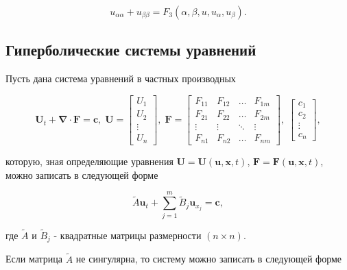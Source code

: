 			\begin{equation}
				u_{\alpha \alpha} + u_{\beta \beta} = F_{3} \left( \alpha, \beta, u, u_{\alpha}, u_{\beta} \right).
			\end{equation}

		\newpage

	\subsection*{Гиперболические системы уравнений}

		Пусть дана система уравнений в частных производных

		\begin{equation}
			\mathbf{U}_{t} + \mathbf{\nabla} \cdot \mathbf{F} = \mathbf{c}, \;
			\mathbf{U} =
			\begin{bmatrix}
				U_{1} \\
				U_{2} \\
				\vdots \\
				U_{n}
			\end{bmatrix}, \;
			\mathbf{F} =
			\begin{bmatrix}
				F_{11} & F_{12} & \ldots & F_{1m} \\
				F_{21} & F_{22} & \ldots & F_{2m} \\
				\vdots & \vdots & \ddots & \vdots \\
				F_{n1} & F_{n2} & \ldots & F_{nm}
			\end{bmatrix}, \;
			\begin{bmatrix}
				c_{1} \\
				c_{2} \\
				\vdots \\
				c_{n}
			\end{bmatrix},
		\end{equation}

		которую, зная определяющие уравнения $\mathbf{U} = \mathbf{U} \left( \mathbf{u}, \mathbf{x}, t \right)$, $\mathbf{F} = \mathbf{F} \left( \mathbf{u}, \mathbf{x}, t \right)$, можно записать в следующей форме

		\begin{equation}
			\tilde{A} \mathbf{u}_{t} + \sum_{j = 1}^{m} \tilde{B}_{j} \mathbf{u}_{x_{j}} = \mathbf{c},
		\end{equation}

		где $\tilde{A}$ и $\tilde{B}_{j}$ - квадратные матрицы размерности $(n \times n)$.

		Если матрица $\tilde{A}$ не сингулярна, то систему можно записать в следующей форме


